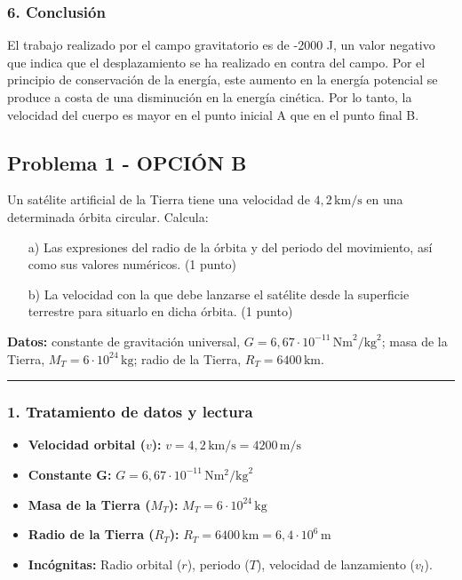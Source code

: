 \subsubsection*{6. Conclusión}
\begin{cajaconclusion}
El trabajo realizado por el campo gravitatorio es de -2000 J, un valor negativo que indica que el desplazamiento se ha realizado en contra del campo. Por el principio de conservación de la energía, este aumento en la energía potencial se produce a costa de una disminución en la energía cinética. Por lo tanto, la velocidad del cuerpo es mayor en el punto inicial A que en el punto final B.
\end{cajaconclusion}

\newpage

\subsection{Problema 1 - OPCIÓN B}
\label{subsec:1B_2019_jun_ord}
\begin{cajaenunciado}
Un satélite artificial de la Tierra tiene una velocidad de $4,2\,\text{km/s}$ en una determinada órbita circular. Calcula:
\begin{enumerate}
    \item[a)] Las expresiones del radio de la órbita y del periodo del movimiento, así como sus valores numéricos. (1 punto)
    \item[b)] La velocidad con la que debe lanzarse el satélite desde la superficie terrestre para situarlo en dicha órbita. (1 punto)
\end{enumerate}
\textbf{Datos:} constante de gravitación universal, $G=6,67\cdot10^{-11}\,\text{Nm}^2/\text{kg}^2$; masa de la Tierra, $M_{T}=6\cdot10^{24}\,\text{kg}$; radio de la Tierra, $R_{T}=6400\,\text{km}$.
\end{cajaenunciado}
\hrule
\subsubsection*{1. Tratamiento de datos y lectura}
\begin{itemize}
    \item \textbf{Velocidad orbital ($v$):} $v = 4,2\,\text{km/s} = 4200\,\text{m/s}$
    \item \textbf{Constante G:} $G=6,67\cdot10^{-11}\,\text{N}\text{m}^2/\text{kg}^2$
    \item \textbf{Masa de la Tierra ($M_T$):} $M_T = 6\cdot10^{24}\,\text{kg}$
    \item \textbf{Radio de la Tierra ($R_T$):} $R_T = 6400\,\text{km} = 6,4\cdot10^6\,\text{m}$
    \item \textbf{Incógnitas:} Radio orbital ($r$), periodo ($T$), velocidad de lanzamiento ($v_l$).
\end{itemize}
